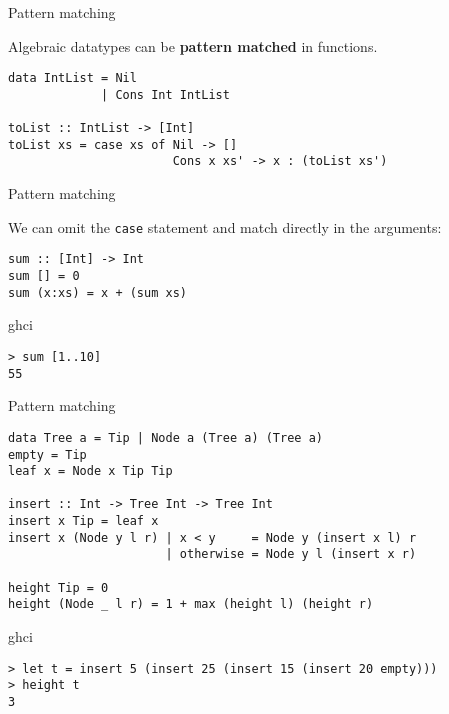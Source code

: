 %
\begin{frame}[fragile]{Pattern matching}

Algebraic datatypes can be \textbf{pattern matched} in functions.

\begin{block}{}
\begin{verbatim}
data IntList = Nil
             | Cons Int IntList

toList :: IntList -> [Int]
toList xs = case xs of Nil -> []
                       Cons x xs' -> x : (toList xs')
\end{verbatim}
\end{block}

\end{frame}

%
\begin{frame}[fragile]{Pattern matching}

We can omit the \texttt{case} statement and match directly in the arguments:

\begin{block}{}
\begin{verbatim}
sum :: [Int] -> Int
sum [] = 0
sum (x:xs) = x + (sum xs)
\end{verbatim}
\end{block}

\begin{block}{ghci}
\begin{verbatim}
> sum [1..10]
55
\end{verbatim}
\end{block}

\end{frame}

%
\begin{frame}[fragile]{Pattern matching}

\begin{block}{}
\begin{verbatim}
data Tree a = Tip | Node a (Tree a) (Tree a)
empty = Tip
leaf x = Node x Tip Tip

insert :: Int -> Tree Int -> Tree Int
insert x Tip = leaf x
insert x (Node y l r) | x < y     = Node y (insert x l) r
                      | otherwise = Node y l (insert x r)

height Tip = 0
height (Node _ l r) = 1 + max (height l) (height r)
\end{verbatim}
\end{block}

\begin{block}{ghci}
\begin{verbatim}
> let t = insert 5 (insert 25 (insert 15 (insert 20 empty)))
> height t
3
\end{verbatim}
\end{block}

\end{frame}

